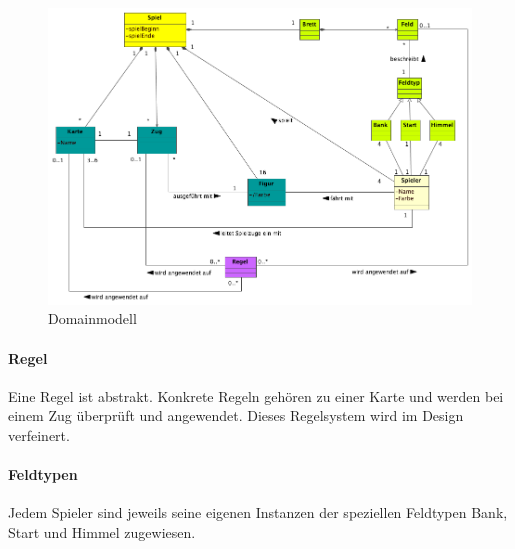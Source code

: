 \documentclass[a4paper,12pt,halfparskip,DIV14]{scrartcl}
\begin{document}
\begin{figure}
	[htp] \centering 
	\includegraphics[width=1\textwidth]{DomainModel.png} \caption{Domainmodell}\label{fig:DomainModel.png} 
\end{figure}
\paragraph{Regel}\label{ssub:regel} %
Eine Regel ist abstrakt. Konkrete Regeln gehören zu einer Karte und werden bei einem Zug überprüft und angewendet. Dieses Regelsystem wird im Design verfeinert.
\paragraph{Feldtypen}\label{ssub:feldtypen} %
Jedem Spieler sind jeweils seine eigenen Instanzen der speziellen Feldtypen Bank, Start und Himmel zugewiesen.

\newpage
\end{document}
